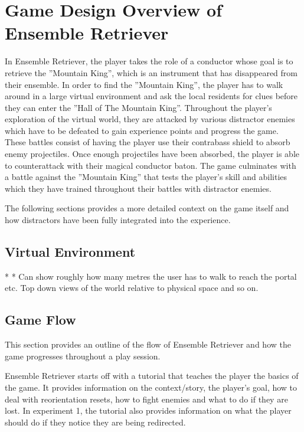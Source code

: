 \section{Game Design Overview of Ensemble Retriever} 
In Ensemble Retriever, the player takes the role of a conductor whose goal is to retrieve the ''Mountain King'', which is an instrument that has disappeared from their ensemble. In order to find the ''Mountain King'', the player has to walk around in a large virtual environment and ask the local residents for clues before they can enter the ''Hall of The Mountain King''. Throughout the player's exploration of the virtual world, they are attacked by various distractor enemies which have to be defeated to gain experience points and progress the game. These battles consist of having the player use their contrabass shield to absorb enemy projectiles. Once enough projectiles have been absorbed, the player is able to counterattack with their magical conductor baton. The game culminates with a battle against the ''Mountain King'' that tests the player's skill and abilities which they have trained throughout their battles with distractor enemies.  

The following sections provides a more detailed context on the game itself and how distractors have been fully integrated into the experience.

\subsection{Virtual Environment}
* 
* Can show roughly how many metres the user has to walk to reach the portal etc. Top down views of the world relative to physical space and so on. 

\subsection{Game Flow}
This section provides an outline of the flow of Ensemble Retriever and how the game progresses throughout a play session. 

Ensemble Retriever starts off with a tutorial that teaches the player the basics of the game. It provides information on the context/story, the player's goal, how to deal with reorientation resets, how to fight enemies and what to do if they are lost. In experiment 1, the tutorial also provides information on what the player should do if they notice they are being redirected. 


